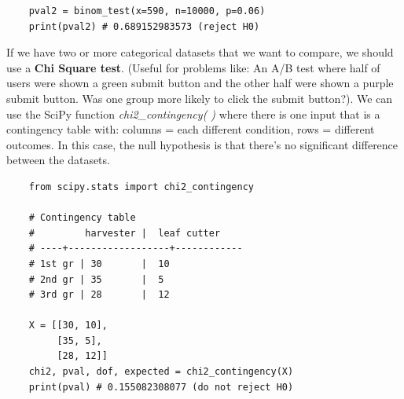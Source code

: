 \documentclass[11pt, a4paper]{article}
\begin{document}
\begin{spacing}{1.1}
\begin{lstlisting}
	pval2 = binom_test(x=590, n=10000, p=0.06)
	print(pval2) # 0.689152983573 (reject H0) \end{lstlisting}\vspace*{1mm}
	If we have two or more categorical datasets that we want to compare, we should use a \textbf{Chi Square test}. (Useful for problems like: An A/B test where half of users were shown a green submit button and the other half were shown a purple submit button. Was one group more likely to click the submit button?). We can use the SciPy function \textit{chi2\_contingency( )} where there is one input that is a contingency table with: columns = each different condition, rows = different outcomes. In this case, the null hypothesis is that there’s no significant difference between the datasets.
	\begin{lstlisting}
	from scipy.stats import chi2_contingency
	
	# Contingency table
	#         harvester |  leaf cutter
	# ----+------------------+------------
	# 1st gr | 30       |  10
	# 2nd gr | 35       |  5
	# 3rd gr | 28       |  12
	
	X = [[30, 10],
	     [35, 5],
	     [28, 12]]
	chi2, pval, dof, expected = chi2_contingency(X)
	print(pval) # 0.155082308077 (do not reject H0) \end{lstlisting}\vspace*{4mm}
	

\end{spacing}
\end{document}
